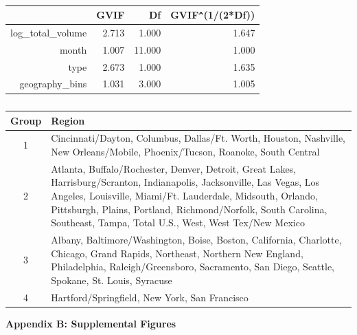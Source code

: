 \documentclass[11pt]{article}\usepackage[]{graphicx}\usepackage[]{color}
\begin{document}
\begin{center}
\begin{table}[ht]
\centering
\begin{tabular}{rrrr}
  \hline
 & GVIF & Df & GVIF\verb|^|(1/(2*Df)) \\ 
  \hline
log\_total\_volume & 2.713 & 1.000 & 1.647 \\ 
  month & 1.007 & 11.000 & 1.000 \\ 
  type & 2.673 & 1.000 & 1.635 \\ 
  geography\_bins & 1.031 & 3.000 & 1.005 \\ 
   \hline
\end{tabular}
\caption{} 
\label{vif_table}
\end{table}

\end{center} 


\begin{center}
\begin{table}[ht]
\centering
\begin{tabular}{cp{5in}}
  \hline
Group & Region \\ 
  \hline
1 & Cincinnati/Dayton, Columbus, Dallas/Ft. Worth, Houston, Nashville, New Orleans/Mobile, Phoenix/Tucson, Roanoke, South Central \\ 
  2 & Atlanta, Buffalo/Rochester, Denver, Detroit, Great Lakes, Harrisburg/Scranton, Indianapolis, Jacksonville, Las Vegas, Los Angeles, Louisville, Miami/Ft. Lauderdale, Midsouth, Orlando, Pittsburgh, Plains, Portland, Richmond/Norfolk, South Carolina, Southeast, Tampa, Total U.S., West, West Tex/New Mexico \\ 
  3 & Albany, Baltimore/Washington, Boise, Boston, California, Charlotte, Chicago, Grand Rapids, Northeast, Northern New England, Philadelphia, Raleigh/Greensboro, Sacramento, San Diego, Seattle, Spokane, St. Louis, Syracuse \\ 
  4 & Hartford/Springfield, New York, San Francisco \\ 
   \hline
\end{tabular}
\caption{} 
\label{region}
\end{table}

\end{center} 


\clearpage
\newpage
\noindent \Large{{\bf Appendix B: Supplemental Figures}}
\end{document}
